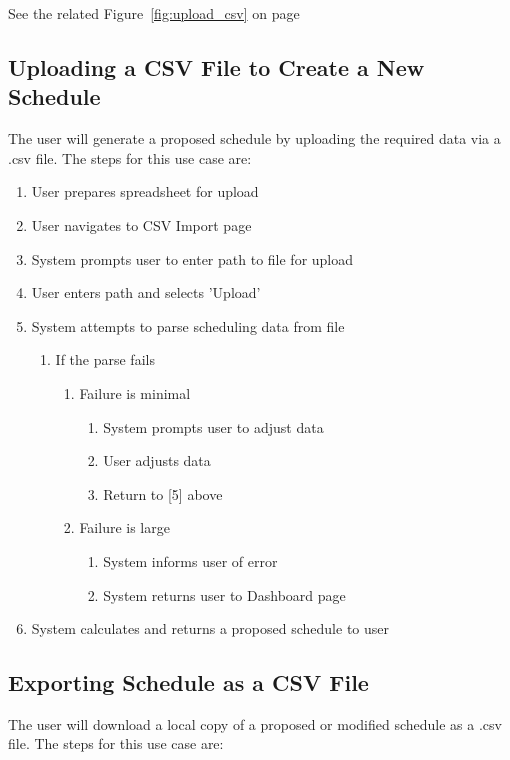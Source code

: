 \documentclass{extarticle}
\begin{document}
See the related Figure~\ref{fig:upload_csv} on page~\pageref{fig:upload_csv}

\subsection{Uploading a CSV File to Create a New Schedule}
The user will generate a proposed schedule by uploading the required data via a .csv file.  The steps for this use
case are:

\begin{enumerate}
\item User prepares spreadsheet for upload
\item User navigates to CSV Import page
\item System prompts user to enter path to file for upload
\item User enters path and selects 'Upload'
\item System attempts to parse scheduling data from file
  \begin{enumerate}
  \item If the parse fails
    \begin{enumerate}
    \item Failure is minimal
      \begin{enumerate}
        \item System prompts user to adjust data
        \item User adjusts data
        \item Return to [5] above
      \end{enumerate}
    \item Failure is large
      \begin{enumerate}
        \item System informs user of error
        \item System returns user to Dashboard page
      \end{enumerate}
    \end{enumerate}
  \end{enumerate}
\item System calculates and returns a proposed schedule to user
\end{enumerate}

\subsection{Exporting Schedule as a CSV File}
The user will download a local copy of a proposed or modified schedule as a .csv file.  The steps for this use
case are:
\end{document}
